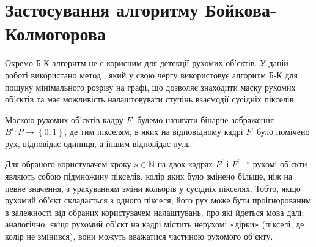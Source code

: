 \section{Застосування алгоритму Бойкова-Колмогорова}

Окремо Б-К алгоритм не є корисним для детекції рухомих об'єктів. У даній роботі
використано метод \cite{pavliuk_krygin}, який у свою чергу використовує алгоритм Б-К
для пошуку мінімального розрізу на графі, що дозволяє знаходити
маску рухомих об'єктів та має можливість налаштовувати ступінь взаємодії сусідніх
пікселів.
\begin{definition}
	Маскою рухомих об'єктів кадру \(F^{i}\) будемо називати бінарне
	зображення \(B^{i}:P \rightarrow \left\{ 0,1 \right\}\), де тим
	пікселям, в яких на відповідному кадрі \(F^{i}\) було помічено рух,
	відповідає одиниця, а іншим відповідає нуль.
\end{definition}

Для обраного користувачем
кроку $s \in \mathbb{N}$ на двох кадрах \(F^{i}\) і \(F^{i + s}\) рухомі об'єкти
являють собою підмножину пікселів, колір яких було змінено більше, ніж
на певне значення, з урахуванням зміни кольорів у сусідніх пікселях.
Тобто, якщо рухомий об'єкт складається з одного пікселя, його рух може
бути проігнорованим в залежності від обраних користувачем налаштувань,
про які йдеться мова далі; аналогічно, якщо рухомий об'єкт на кадрі
містить нерухомі «дірки» (пікселі, де колір не змінився), вони можуть
вважатися частиною рухомого об'єкту.


